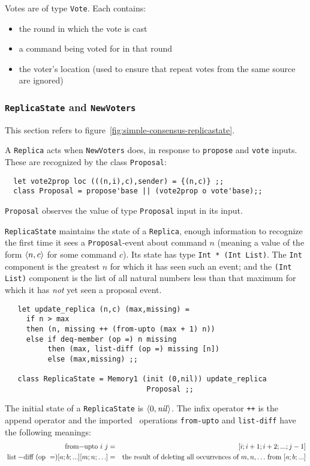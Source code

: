 \documentclass[final]{article}
\newcommand{\listinline}[1]{\text{\lstinline{#1}}}
\begin{document}
Votes are of type \lstinline{Vote}.   Each contains:
\begin{itemize}
\item the round in which the vote is cast
\item a command being voted for in that round
\item the voter's location (used to ensure that repeat votes from the
  same source are ignored)
\end{itemize}


\subsubsection{\lstinline{ReplicaState} and \lstinline{NewVoters}}

This section refers to figure~\ref{fig:simple-consensus-replicastate}.

A \lstinline{Replica} acts when \lstinline{NewVoters} does, in
response to \lstinline{propose} and \lstinline{vote} inputs.  These
are recognized by the class \lstinline{Proposal}:
\begin{emlcode}
\begin{lstlisting}
  let vote2prop loc (((n,i),c),sender) = {(n,c)} ;;
  class Proposal = propose'base || (vote2prop o vote'base);;
\end{lstlisting}
\end{emlcode}
\lstinline{Proposal} observes the value of type \lstinline{Proposal}
input in its input.

\lstinline{ReplicaState} maintains the state of a \lstinline{Replica},
enough information to recognize the first time it sees a
\lstinline{Proposal}-event about command $n$ (meaning a value of the
form $\langle n,c\rangle$ for some command $c$).  Its state has type
%
\lstinline{Int * (Int List)}.  The \lstinline{Int} component is the
greatest $n$ for which it has seen such an event; and the
%
\lstinline{(Int List)} component is the list of all natural numbers
less than that maximum for which it has \emph{not} yet seen a proposal
event.
\begin{emlcode}
\begin{lstlisting}
   let update_replica (n,c) (max,missing) =
     if n > max
     then (n, missing ++ (from-upto (max + 1) n))
     else if deq-member (op =) n missing
          then (max, list-diff (op =) missing [n])
          else (max,missing) ;;

   class ReplicaState = Memory1 (init (0,nil)) update_replica
                                 Proposal ;;
\end{lstlisting}
\end{emlcode}
The initial state of a \lstinline{ReplicaState} is
$\langle0,\mathit{nil}\rangle$.  The infix operator \lstinline{++} is the
append operator and the imported
\nuprl\ operations \lstinline{from-upto} and \lstinline{list-diff}
have the following meanings:
\begin{eqnarray*}
\listinline{from-upto}~i~j &=& [i; i+1; i+2; ...; j-1] \\
\listinline{list-diff}~(\listinline{op}~=) [a;b;...] [m;n;\ldots] &=&
       \text{the result of deleting all occurrences of $m,n,\ldots$
         from $[a;b;...]$} 
\end{eqnarray*}
\end{document}
